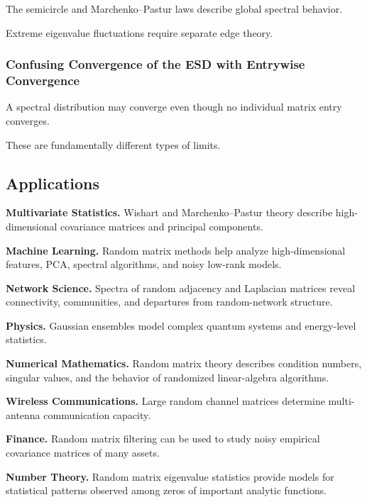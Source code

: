 The semicircle and Marchenko--Pastur laws describe global spectral
behavior.

Extreme eigenvalue fluctuations require separate edge theory.

\subsubsection{Confusing Convergence of the ESD with Entrywise Convergence}

A spectral distribution may converge even though no individual matrix
entry converges.

These are fundamentally different types of limits.

\subsection{Applications}
\label{subsec:rmt-applications}

\begin{applicationbox}

\textbf{Multivariate Statistics.}
Wishart and Marchenko--Pastur theory describe high-dimensional covariance
matrices and principal components.

\medskip

\textbf{Machine Learning.}
Random matrix methods help analyze high-dimensional features, PCA,
spectral algorithms, and noisy low-rank models.

\medskip

\textbf{Network Science.}
Spectra of random adjacency and Laplacian matrices reveal connectivity,
communities, and departures from random-network structure.

\medskip

\textbf{Physics.}
Gaussian ensembles model complex quantum systems and energy-level
statistics.

\medskip

\textbf{Numerical Mathematics.}
Random matrix theory describes condition numbers, singular values, and
the behavior of randomized linear-algebra algorithms.

\medskip

\textbf{Wireless Communications.}
Large random channel matrices determine multi-antenna communication
capacity.

\medskip

\textbf{Finance.}
Random matrix filtering can be used to study noisy empirical covariance
matrices of many assets.

\medskip

\textbf{Number Theory.}
Random matrix eigenvalue statistics provide models for statistical
patterns observed among zeros of important analytic functions.

\end{applicationbox}

